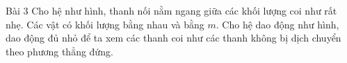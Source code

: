 \begin{frame}{Bài 3}
Cho hệ như hình, thanh nối nằm ngang giữa các khối lượng coi như rất nhẹ. Các vật có khối lượng bằng nhau và bằng \(m\). Cho hệ dao động như hình, dao động đủ nhỏ để ta xem các thanh coi như các thanh không bị dịch chuyển theo phương thẳng đứng. 
\begin{center}
    \resizebox{0.8\linewidth}{!}{}
\end{center}
\end{frame}